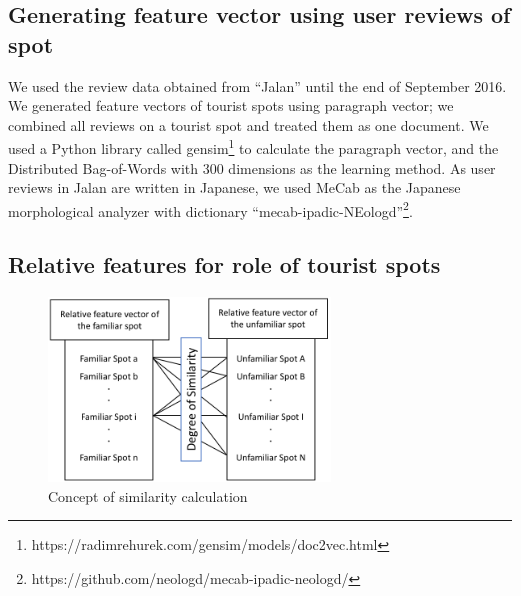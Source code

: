 \documentclass[journal]{IAENGtran}
\begin{document}
\subsection{Generating feature vector using user reviews of spot}
\label{subsec:Generating feature vector using user reviews of spot}
We used the review data obtained from ``Jalan'' until the end of September 2016.
We generated feature vectors of tourist spots using paragraph vector\cite{Codd10}; we combined all reviews on a tourist spot and treated them as one document.
We used a Python library called gensim\footnote{https://radimrehurek.com/gensim/models/doc2vec.html} to calculate the paragraph vector, and the Distributed Bag-of-Words with 300 dimensions as the learning method.
As user reviews in Jalan are written in Japanese, we used MeCab\cite{Codd11} as the Japanese morphological analyzer with dictionary ``mecab-ipadic-NEologd''\footnote{https://github.com/neologd/mecab-ipadic-neologd/}.

\subsection{Relative features for role of tourist spots}
\label{Relative features for role of tourist spots}

\begin{figure}[t]
  \begin{center}
    \includegraphics[clip,width=7.5cm,bb=0 0 702 458]{picture/Photo_CosSim_eng.png}
    \caption{Concept of similarity calculation}
    \label{fig:Photo_CosSim}
  \end{center}
\end{figure}
\end{document}
